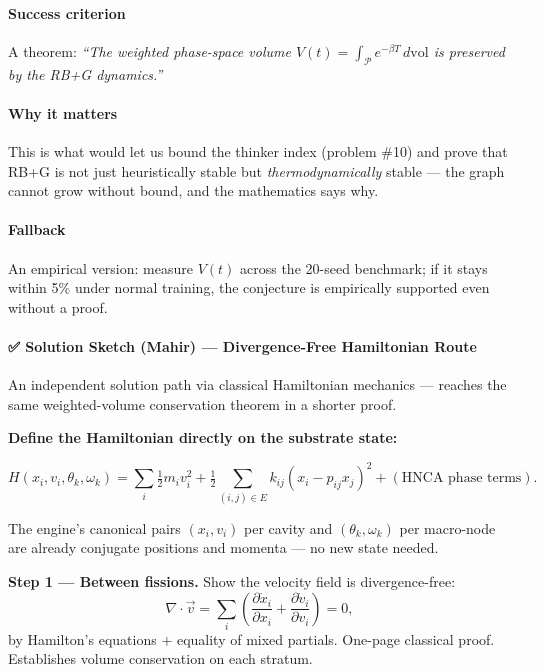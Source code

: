\documentclass[
  11pt,
  a4paper,
]{article}
\begin{document}
\paragraph{Success criterion}\label{success-criterion-7}

A theorem: \emph{``The weighted phase-space volume
\(V(t) = \int_{\mathcal{P}} e^{-\beta T} \, d\text{vol}\) is preserved
by the RB+G dynamics.''}

\paragraph{Why it matters}\label{why-it-matters}

This is what would let us bound the thinker index (problem \#10) and
prove that RB+G is not just heuristically stable but
\emph{thermodynamically} stable --- the graph cannot grow without bound,
and the mathematics says why.

\paragraph{Fallback}\label{fallback-2}

An empirical version: measure \(V(t)\) across the 20-seed benchmark; if
it stays within 5\% under normal training, the conjecture is empirically
supported even without a proof.

\paragraph{✅ Solution Sketch (Mahir) --- Divergence-Free Hamiltonian
Route}\label{solution-sketch-mahir-divergence-free-hamiltonian-route}

An independent solution path via classical Hamiltonian mechanics ---
reaches the same weighted-volume conservation theorem in a shorter
proof.

\textbf{Define the Hamiltonian directly on the substrate state:}

\[
H(x_i, v_i, \theta_k, \omega_k) = \sum_i \tfrac{1}{2} m_i v_i^2
                                + \tfrac{1}{2} \sum_{(i,j) \in E} k_{ij} (x_i - p_{ij} x_j)^2
                                + (\text{HNCA phase terms}).
\]

The engine's canonical pairs \((x_i, v_i)\) per cavity and
\((\theta_k, \omega_k)\) per macro-node are already conjugate positions
and momenta --- no new state needed.

\textbf{Step 1 --- Between fissions.} Show the velocity field is
divergence-free: \[
\nabla \cdot \vec{v} = \sum_i\left(\frac{\partial \dot{x}_i}{\partial x_i} + \frac{\partial \dot{v}_i}{\partial v_i}\right) = 0,
\] by Hamilton's equations + equality of mixed partials. One-page
classical proof. Establishes volume conservation on each stratum.
\end{document}
